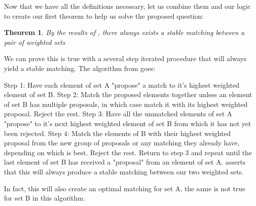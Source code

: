 \documentclass[letterpaper,11pt,twocolumn]{article}
\newtheorem{theorem}{Theorem}
\begin{document}
Now that we have all the definitions necessary, let us combine them and our logic to create our first theorem to help us solve the proposed question:
	
\begin{theorem}\label{thm1}
	By the results of \cite{latexcompanion}, there always exists a stable matching between a pair of weighted sets
	\end{theorem}
We can prove this is true with a several step iterated procedure that will always yield a stable matching. The algorithm from \cite{latexcompanion} goes:

Step 1: Have each element of set A "propose" a match to it's highest weighted element of set B.
Step 2: Match the proposed elements together unless an element of set B has multiple proposals, in which case match it with its highest weighted proposal. Reject the rest.
Step 3: Have all the unmatched elements of set A "propose" to it's next highest weighted element of set B from which it has not yet been rejected.
Step 4: Match the elements of B with their highest weighted proposal from the new group of proposals or any matching they already have, depending on which is best. Reject the rest.
Return to step 3 and repeat until the last element of set B has received a "proposal" from an element of set A. \cite{latexcompanion} asserts that this will always produce a stable matching between our two weighted sets.

In fact, this will also create an optimal matching for set A, the same is not true for set B in this algorithm.
\end{document}
